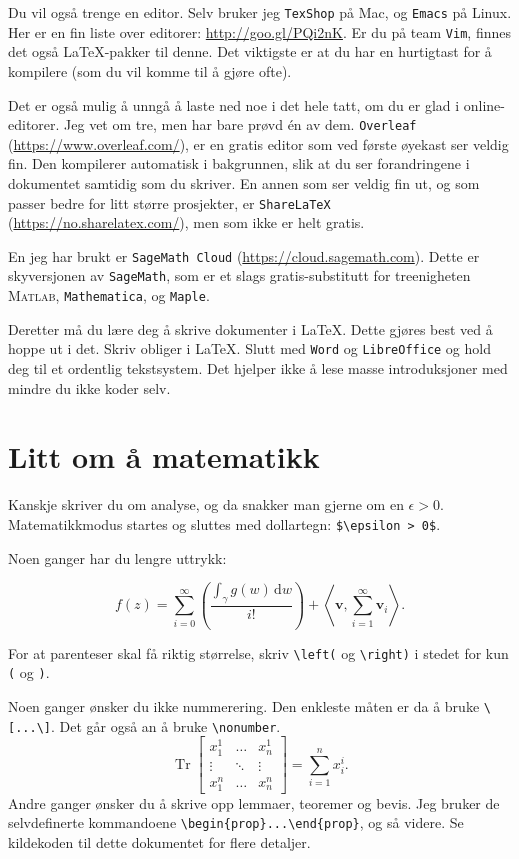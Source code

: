 \documentclass[a4paper, norsk]{article}  %
\DeclareMathOperator{\tr}{Tr}
\begin{document}
Du vil også trenge en editor. Selv bruker jeg \texttt{TexShop} på Mac, og \texttt{Emacs} på Linux. Her er en fin liste over editorer: \url{http://goo.gl/PQi2nK}. Er du på team \texttt{Vim}, finnes det også \LaTeX-pakker til denne. Det viktigste er at du har en hurtigtast for å kompilere (som du vil komme til å gjøre ofte).

Det er også mulig å unngå å laste ned noe i det hele tatt, om du er glad i online-editorer. Jeg vet om tre, men har bare prøvd én av dem. \texttt{Overleaf} (\url{https://www.overleaf.com/}), er en gratis editor som ved første øyekast ser veldig fin. Den kompilerer automatisk i bakgrunnen, slik at du ser forandringene i dokumentet samtidig som du skriver. En annen som ser veldig fin ut, og som passer bedre for litt større prosjekter, er \texttt{ShareLaTeX} (\url{https://no.sharelatex.com/}), men som ikke er helt gratis.

En jeg har brukt er \texttt{SageMath Cloud} (\url{https://cloud.sagemath.com}). Dette er skyversjonen av \texttt{SageMath}, som er et slags gratis-substitutt for treenigheten \textsc{Matlab}, \texttt{Mathematica}, og \texttt{Maple}.

Deretter må du lære deg å skrive dokumenter i \LaTeX. Dette gjøres best ved å hoppe ut i det. Skriv obliger i \LaTeX. Slutt med \texttt{Word} og \texttt{LibreOffice} og hold deg til et ordentlig tekstsystem. Det hjelper ikke å lese masse introduksjoner med mindre du ikke koder selv.

\section{Litt om å matematikk}
\label{sec:matte}

Kanskje skriver du om analyse, og da snakker man gjerne om en $\epsilon > 0 $. Matematikk\-modus startes og sluttes med dollartegn: \verb|$\epsilon > 0$|. 

Noen ganger har du lengre uttrykk:

\begin{equation}
    f(z) = \sum_{i = 0}^\infty 
    \left( \frac{\int_\gamma g(w) \, \mathrm{d}w}{i!} \right) 
    + 
    \left\langle \mathbf{v}, \sum_{i = 1}^\infty \mathbf{v}_i \right\rangle.
\end{equation}

For at parenteser skal få riktig størrelse, skriv \verb|\left(| og \verb|\right)| i stedet for kun \texttt{(} og \texttt{)}.

Noen ganger ønsker du ikke nummerering. Den enkleste måten er da å bruke \verb|\[...\]|. Det går også an å bruke \verb|\nonumber|. 
\[
    \tr 
    \begin{bmatrix}
         x_1^1 & \hdots &  x_n^1 \\
        \vdots & \ddots & \vdots \\
         x_1^n & \hdots &  x_n^n
    \end{bmatrix} 
    = 
    \sum_{i = 1}^n x_i^i.
\]
Andre ganger ønsker du å skrive opp lemmaer, teoremer og bevis. Jeg bruker de selvdefinerte kommandoene \verb|\begin{prop}...\end{prop}|, og så videre. Se kildekoden til dette dokumentet for flere detaljer.
\end{document}
